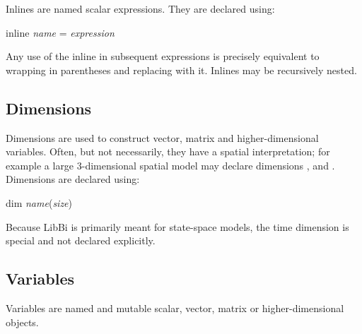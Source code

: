 Inlines are named scalar expressions. They are declared using:
\begin{bicode}
inline \emph{name} = \emph{expression}
\end{bicode}
Any use of the inline  in subsequent expressions is
precisely equivalent to wrapping  in parentheses and
replacing  with it. Inlines may be recursively nested.

\subsection{Dimensions\label{Dimensions}}

 Dimensions are used to construct
vector, matrix and
higher-dimensional variables. Often, but not
necessarily, they have a spatial interpretation; for example a large
3-dimensional spatial model may declare dimensions
,  and . Dimensions are declared using:
\begin{bicode}
dim \emph{name}(\emph{size})
\end{bicode}

\begin{tip}
Because LibBi is primarily meant for state-space models, the time dimension is
special and not declared explicitly.
\end{tip}

\subsection{Variables\label{Variables}}

 Variables are named and mutable
scalar, vector, matrix or
higher-dimensional objects.


